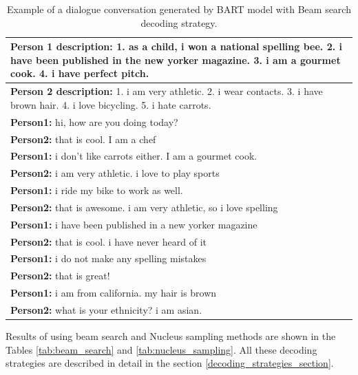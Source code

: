 \begin{table}[H]
\centering
 \begin{tabular}{|p{14cm}|}
 \hline
 \textbf{Person 1 description:} 1. as a child, i won a national spelling bee. 2. i have been published in the new yorker magazine. 3. i am a gourmet cook. 4. i have perfect pitch. \\
 \hline
 \textbf{Person 2 description:} 1. i am very athletic. 2. i wear contacts. 3. i have brown hair. 4. i love bicycling. 5. i hate carrots. \\
 \hline
 \textbf{Person1:} hi, how are you doing today?  \\
 \textbf{Person2:} that is cool. I am a chef  \\ 
 \textbf{Person1:} i don't like carrots either. I am a gourmet cook. \\
 \textbf{Person2:} i am very athletic. i love to play sports \\
 \textbf{Person1:} i ride my bike to work as well. \\
 \textbf{Person2:} that is awesome. i am very athletic, so i love spelling \\
 \textbf{Person1:} i have been published in a new yorker magazine \\
 \textbf{Person2:} that is cool. i have never heard of it \\
 \textbf{Person1:} i do not make any spelling mistakes\\
 \textbf{Person2:} that is great! \\
 \textbf{Person1:} i am from california. my hair is brown \\
 \textbf{Person2:} what is your ethnicity? i am asian. \\
 \hline
 \end{tabular}
 \caption{Example of a dialogue conversation generated by BART model with Beam search decoding strategy.}
\label{tab:bart_experiment}
\end{table}

Results of using beam search and Nucleus sampling methods are shown in the Tables \ref{tab:beam_search} and \ref{tab:nucleus_sampling}. All these decoding strategies are described in detail in the section \ref{decoding_strategies_section}.

